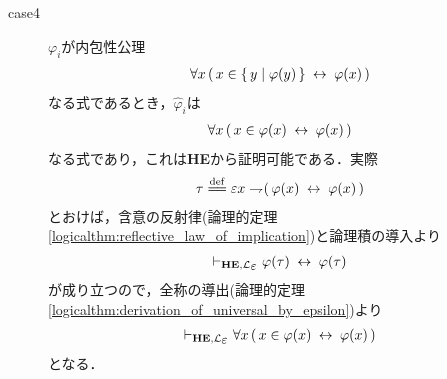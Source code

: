 \begin{metaprf}
\begin{description}
			\item[case4] $\varphi_{i}$が内包性公理
				\begin{align}
					\forall x\, (\, x \in \{\, y \mid \varphi(y)\, \} \hspace{0.25em}\leftrightarrow\hspace{0.25em} \varphi(x)\, )
				\end{align}
				なる式であるとき，$\widehat{\varphi}_{i}$は
				\begin{align}
					\forall x\, (\, x \in \varphi(x) \hspace{0.25em}\leftrightarrow\hspace{0.25em} \varphi(x)\, )
				\end{align}
				なる式であり，これは{\bf HE}から証明可能である．実際
				\begin{align}
					\tau \defeq \varepsilon x \negation (\, \varphi(x) \lrarrow \varphi(x)\, )
				\end{align}
				とおけば，含意の反射律(論理的定理\ref{logicalthm:reflective_law_of_implication})と論理積の導入より
				\begin{align}
					\provable{\mbox{{\bf HE}},\lang{\varepsilon}} \varphi(\tau) \lrarrow \varphi(\tau)
				\end{align}
				が成り立つので，全称の導出(論理的定理\ref{logicalthm:derivation_of_universal_by_epsilon})より
				\begin{align}
					\provable{\mbox{{\bf HE}},\lang{\varepsilon}} \forall x\, (\, x \in \varphi(x) \lrarrow \varphi(x)\, )
				\end{align}
				となる．
			

\end{description}
\end{metaprf}
